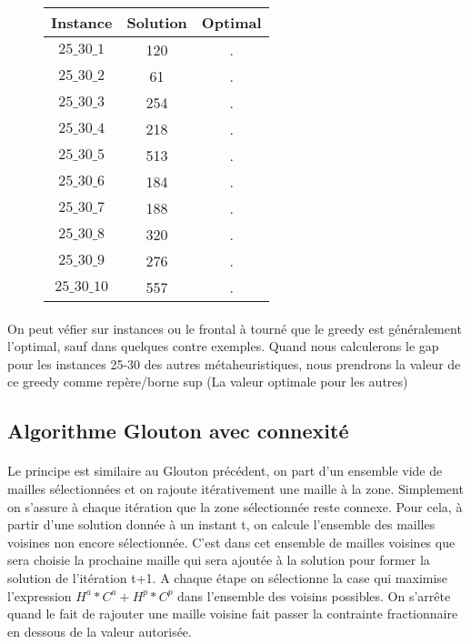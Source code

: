 \documentclass[a4paper, 11pt]{article} %
\begin{document}
\begin{center}
\begin{figure}[H]
      \begin{tabular}{|c|c|c|}
      \hline 
        Instance & Solution & Optimal  \\ \hline
        $25\_30\_1$ & 120  & .  \\ \hline
        $25\_30\_2$ & 61  & .  \\ \hline
        $25\_30\_3$ & 254  & .  \\ \hline
        $25\_30\_4$ & 218  & .  \\ \hline
        $25\_30\_5$ & 513  & .  \\ \hline
        $25\_30\_6$ & 184  & .  \\ \hline
        $25\_30\_7$ & 188  & .  \\ \hline
        $25\_30\_8$ & 320  & .  \\ \hline
        $25\_30\_9$ & 276  & .  \\ \hline
        $25\_30\_10$ & 557 & .  \\ \hline
      \end{tabular}
\end{figure}
\end{center}

\paragraph*{}
On peut véfier sur instances ou le frontal à tourné que le greedy est généralement l'optimal, sauf dans quelques contre exemples. Quand nous calculerons le gap pour les instances 25-30 des autres métaheuristiques, nous prendrons la valeur de ce greedy comme repère/borne sup (La valeur optimale pour les autres)

\subsection{Algorithme Glouton avec connexité}

\paragraph*{}
Le principe est similaire au Glouton précédent, on part d'un ensemble vide de mailles sélectionnées et on rajoute itérativement une maille à la zone. Simplement on s'assure à chaque itération que la zone sélectionnée reste connexe. Pour cela, à partir d'une solution donnée à un instant t, on calcule l'ensemble des mailles voisines non encore sélectionnée. C'est dans cet ensemble de mailles voisines que sera choisie la prochaine maille qui sera ajoutée à la solution pour former la solution de l'itération t+1. A chaque étape on sélectionne la case qui maximise l'expression $H^a*C^a+H^p*C^p$ dans l'ensemble des voisins possibles. On s'arrête quand le fait de rajouter une maille voisine fait passer la contrainte fractionnaire en dessous de la valeur autorisée.
\end{document}
